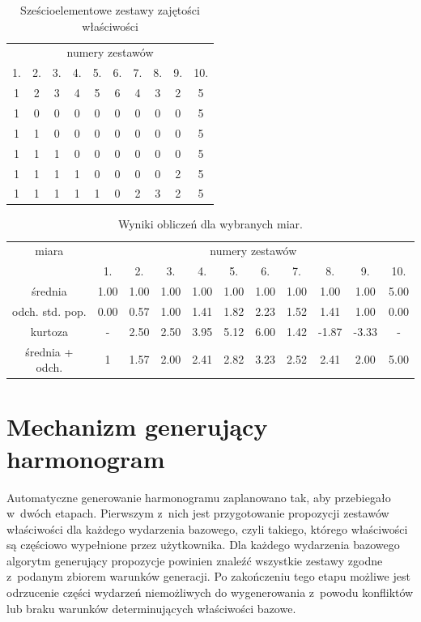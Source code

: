 \documentclass[a4paper]{book}
\begin{document}
\begin{table}
	\centering
	\caption{Sześcioelementowe zestawy zajętości właściwości}
	\label{tab:alg1}
	\begin{tabular}{cccccccccc}
		\toprule
		\multicolumn{10}{c}{numery zestawów} \\
		1.  & 2. & 3. & 4. & 5. & 6. & 7. & 8. & 9. & 10. \\
		\midrule
		1 & 2 & 3 & 4 & 5 & 6 & 4 & 3 & 2 & 5 \\
		1 & 0 & 0 & 0 & 0 & 0 & 0 & 0 & 0 & 5 \\
		1 & 1 & 0 & 0 & 0 & 0 & 0 & 0 & 0 & 5 \\
		1 & 1 & 1 & 0 & 0 & 0 & 0 & 0 & 0 & 5 \\
		1 & 1 & 1 & 1 & 0 & 0 & 0 & 0 & 2 & 5 \\
		1 & 1 & 1 & 1 & 1 & 0 & 2 & 3 & 2 & 5 \\
		\bottomrule
	\end{tabular}
\end{table}

\begin{table}
	\centering
	\caption{Wyniki obliczeń dla wybranych miar.}
	\label{tab:alg2}
	\begin{tabular}{ccccccccccc}
		\toprule
		\multicolumn{1}{c}{miara} & \multicolumn{10}{c}{numery zestawów}  \\
		& 1.  & 2. & 3. & 4. & 5. & 6. & 7. & 8. & 9. & 10. \\
		\midrule
		średnia          & 1.00 & 1.00 & 1.00 & 1.00 & 1.00 & 1.00 & 1.00 & 1.00 & 1.00 & 5.00 \\
		odch. std. pop.  & 0.00 & 0.57 & 1.00 & 1.41 & 1.82 & 2.23 & 1.52 & 1.41 & 1.00 & 0.00 \\
		kurtoza 		 & - & 2.50 & 2.50 & 3.95 & 5.12 & 6.00 & 1.42 & -1.87 & -3.33 & - \\
		średnia + odch.  & 1 & 1.57 & 2.00 & 2.41 & 2.82 & 3.23 & 2.52 & 2.41 & 2.00 & 5.00 \\
		\bottomrule
	\end{tabular}
\end{table}

\section{Mechanizm generujący harmonogram}
Automatyczne generowanie harmonogramu zaplanowano tak, aby przebiegało w~dwóch etapach. Pierwszym z~nich jest przygotowanie propozycji zestawów właściwości dla każdego wydarzenia bazowego, czyli takiego, którego właściwości są częściowo wypełnione przez użytkownika. Dla każdego wydarzenia bazowego algorytm generujący propozycje powinien znaleźć wszystkie zestawy zgodne z~podanym zbiorem warunków generacji. Po zakończeniu tego etapu możliwe jest odrzucenie części wydarzeń niemożliwych do wygenerowania z~powodu konfliktów lub braku warunków determinujących właściwości bazowe.
\end{document}
